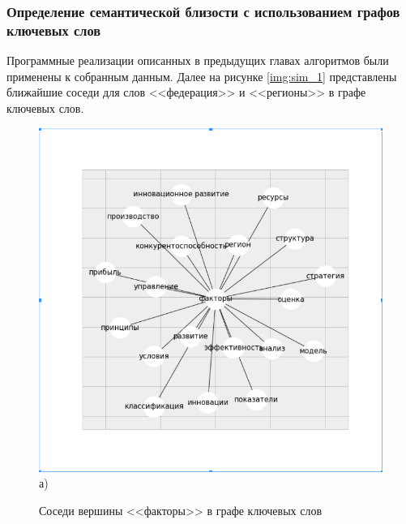 \subsubsection{Определение семантической близости с использованием графов ключевых слов}
Программные реализации описанных в предыдущих главах алгоритмов были применены к собранным данным. Далее на рисунке \ref{img:sim_1} представлены ближайшие соседи для слов <<федерация>> и <<регионы>> в графе ключевых слов.

\begin{figure}[ht]
  \begin{minipage}[ht]{0.49\linewidth}\centering
    \includegraphics[width=1.0\linewidth]{Dissertation/pics/factory_sim} \\ а)
    \caption{Соседи вершины <<факторы>> в графе ключевых слов}
  \end{minipage}
  \hfill
  \begin{minipage}[ht]{0.49\linewidth}\centering

\end{minipage}
\end{figure}
